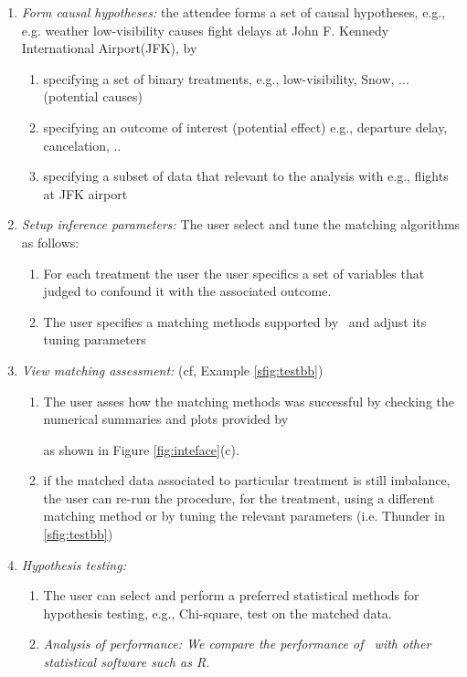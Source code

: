 \begin{enumerate}
  \item {\it Form causal hypotheses:} the attendee forms a set of causal hypotheses, e.g.,
   e.g. weather low-visibility causes fight delays at John F. Kennedy International Airport(JFK), by
    \begin{enumerate}
      \item specifying a set of binary treatments, e.g., low-visibility, Snow, ... (potential causes)
      \item specifying an outcome of interest (potential effect) e.g., departure delay, cancelation, ..
      \item specifying a subset of data that relevant to the analysis with e.g., flights at JFK airport
    \end{enumerate}

  \item {\it Setup inference parameters:} The user select and tune the matching algorithms as follows:
     \begin{enumerate}
      \item For each treatment the user the user specifics a set of variables that judged to confound it with the associated outcome.
          \item The user specifies a matching methods supported by \GSQL\ and adjust its tuning parameters
\end{enumerate}

  \item {\it View matching assessment:} (cf, Example \ref{sfig:testbb})
    \begin{enumerate}
      \item The user asses how the matching methods was successful by checking the numerical summaries and plots provided by \GSQL {} as shown in Figure \ref{fig:inteface}(c).
      \item
      if the matched data associated to  particular treatment is still imbalance, the user can re-run the procedure, for the treatment,
        using a different matching method or by tuning the relevant parameters (i.e. Thunder in \ref{sfig:testbb})
    \end{enumerate}
  \item {\it Hypothesis testing:}
    \begin{enumerate}
      \item The user can select and perform a preferred statistical methods for hypothesis testing, e.g., Chi-square, test on the matched data.
    \item {\it Analysis of performance: We compare the performance of \GSQL\ with other statistical software such as R.}
   
    \end{enumerate}
\end{enumerate}



